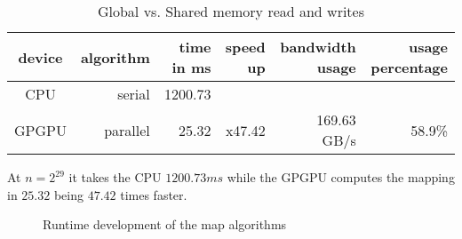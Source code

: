 \begin{table}[htb]
  \centering
  \begin{tabular}{c r | r r r r}
    \toprule
    device & algorithm & time in ms & speed up & bandwidth usage & usage percentage\\
    \midrule
    CPU & serial  & 1200.73 &  &  &  \\
    GPGPU & parallel & 25.32 & x47.42 & 169.63 GB/s & 58.9\% \\
    \bottomrule
  \end{tabular}
  \caption{Global vs. Shared memory read and writes}
  \label{tab:mapping cpu vs gpgpu}
\end{table}

At $n = 2^{29}$ it takes the CPU $1200.73 ms$ while the GPGPU computes the mapping in $25.32$ being $47.42$ times faster.

\begin{figure}[htb]
  \centering
  
  \caption{Runtime development of the map algorithms}
  \label{fig:map plot}
\end{figure}
